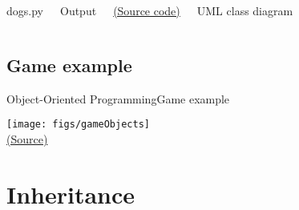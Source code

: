 \documentclass[10pt,compress]{beamer} %
\begin{document}
\begin{frame}[plain]%
    \vspace{-0.3cm}

    \begin{columns}
			\begin{exampleblock}{dogs.py}
			\vspace{-0.3cm} 
				
			\end{exampleblock}

			\begin{exampleblock}{Output}
			\vspace{-0.3cm} 
				
			\end{exampleblock}

		\href{https://gist.github.com/dfbarrero/9b30c749986885373c8c250b3901ec9d}{(Source code)}

        \bigskip

        \pause

        \centering UML class diagram


    \end{columns}
\end{frame}

\subsection{Game example}

\begin{frame}[plain]{Object-Oriented Programming}{Game example}
	\begin{center}
    	\centering \texttt{[image: figs/gameObjects]}\\
		\smallskip
		\tiny{\href{http://blog.nuclex-games.com/2010/01/game-architecture-day-2/}{(Source)}}
	\end{center}
\end{frame}

\section{Inheritance}
\end{document}

